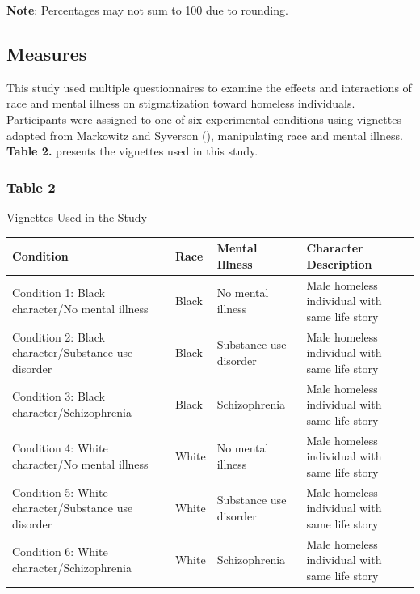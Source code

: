 \documentclass[
  man,
  floatsintext,
  longtable,
  nolmodern,
  notxfonts,
  notimes,
  colorlinks=true,linkcolor=blue,citecolor=blue,urlcolor=blue]{apa7}
\begin{document}
\textbf{Note}: Percentages may not sum to 100 due to rounding.

\subsection{Measures}\label{measures}

This study used multiple questionnaires to examine the effects and
interactions of race and mental illness on stigmatization toward
homeless individuals. Participants were assigned to one of six
experimental conditions using vignettes adapted from Markowitz and
Syverson (),
manipulating race and mental illness. \textbf{Table 2.} presents the
vignettes used in this study.

\subsubsection{Table 2}\label{table-2}

Vignettes Used in the Study

\begin{longtable}[]{@{}
  >{\raggedright\arraybackslash}p{}
  >{\raggedright\arraybackslash}p{}
  >{\raggedright\arraybackslash}p{}
  >{\raggedright\arraybackslash}p{}@{}}
\toprule\noalign{}
\begin{minipage}[b]{\linewidth}\raggedright
\textbf{Condition}
\end{minipage} & \begin{minipage}[b]{\linewidth}\raggedright
\textbf{Race}
\end{minipage} & \begin{minipage}[b]{\linewidth}\raggedright
\textbf{Mental Illness}
\end{minipage} & \begin{minipage}[b]{\linewidth}\raggedright
\textbf{Character Description}
\end{minipage} \\
\midrule\noalign{}
\endhead
\bottomrule\noalign{}
\endlastfoot
Condition 1: Black character/No mental illness & Black & No mental
illness & Male homeless individual with same life story \\
Condition 2: Black character/Substance use disorder & Black & Substance
use disorder & Male homeless individual with same life story \\
Condition 3: Black character/Schizophrenia & Black & Schizophrenia &
Male homeless individual with same life story \\
Condition 4: White character/No mental illness & White & No mental
illness & Male homeless individual with same life story \\
Condition 5: White character/Substance use disorder & White & Substance
use disorder & Male homeless individual with same life story \\
Condition 6: White character/Schizophrenia & White & Schizophrenia &
Male homeless individual with same life story \\
\end{longtable}
\end{document}
